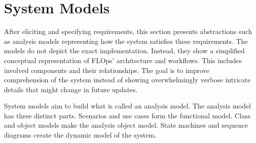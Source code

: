 \section{System Models}

After eliciting and specifying requirements, this section presents abstractions such as analysis models representing how the system satisfies these requirements.
The models do not depict the exact implementation.
Instead, they show a simplified conceptual representation of FLOps' architecture and workflows.
This includes involved components and their relationships.
The goal is to improve comprehension of the system instead of showing overwhelmingly verbose intricate details that might change in future updates.

System models aim to build what is called an analysis model.
The analysis model has three distinct parts.
Scenarios and use cases form the functional model.
Class and object models make the analysis object model.
State machines and sequence diagrams create the dynamic model of the system. \cite{book:bruegge}










